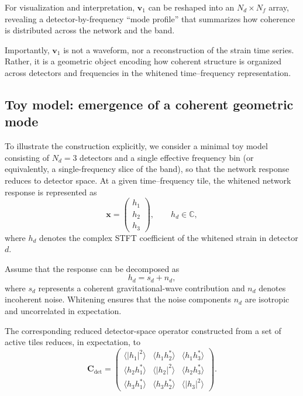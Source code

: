 \documentclass[11pt,a4paper]{article}
\begin{document}
For visualization and interpretation, $\mathbf{v}_1$ can be reshaped into an $N_d\times N_f$ array, revealing a detector-by-frequency ``mode profile'' that summarizes how coherence is distributed across the network and the band.

Importantly, $\mathbf{v}_1$ is not a waveform, nor a reconstruction of the strain time series. Rather, it is a geometric object encoding how coherent structure is organized across detectors and frequencies in the whitened time--frequency representation.

\subsection{Toy model: emergence of a coherent geometric mode}

To illustrate the construction explicitly, we consider a minimal toy model consisting of $N_d = 3$ detectors and a single effective frequency bin (or equivalently, a single-frequency slice of the band), so that the network response reduces to detector space.
At a given time--frequency tile, the whitened network response is represented as
\begin{equation}
\mathbf{x} =
\begin{pmatrix}
h_1 \\
h_2 \\
h_3
\end{pmatrix},
\qquad
h_d \in \mathbb{C},
\end{equation}
where $h_d$ denotes the complex STFT coefficient of the whitened strain in detector $d$.

Assume that the response can be decomposed as
\begin{equation}
h_d = s_d + n_d,
\end{equation}
where $s_d$ represents a coherent gravitational-wave contribution and $n_d$ denotes incoherent noise.
Whitening ensures that the noise components $n_d$ are isotropic and uncorrelated in expectation.

The corresponding reduced detector-space operator constructed from a set of active tiles reduces, in expectation, to
\begin{equation}
\mathbf{C}_{\mathrm{det}}
=
\begin{pmatrix}
\langle |h_1|^2 \rangle & \langle h_1 h_2^* \rangle & \langle h_1 h_3^* \rangle \\
\langle h_2 h_1^* \rangle & \langle |h_2|^2 \rangle & \langle h_2 h_3^* \rangle \\
\langle h_3 h_1^* \rangle & \langle h_3 h_2^* \rangle & \langle |h_3|^2 \rangle
\end{pmatrix}.
\end{equation}
\end{document}
